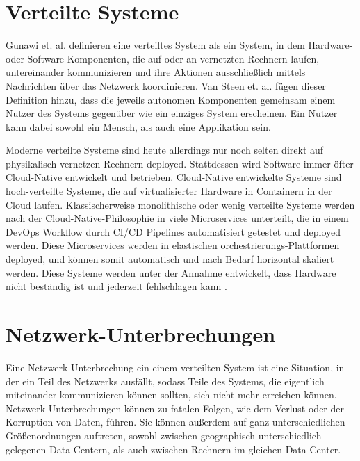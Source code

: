 \documentclass[12pt,a4paper]{report}
\begin{document}
\section{Verteilte Systeme}
Gunawi et. al. \cite{distributed_systems_concepts_and_design} definieren eine verteiltes System als ein System, in dem Hardware-
oder Software-Komponenten, die auf oder an vernetzten Rechnern laufen, untereinander kommunizieren und ihre Aktionen
ausschließlich mittels Nachrichten über das Netzwerk koordinieren. Van Steen et. al.
\cite{brief_introduction_to_distributed_systems} fügen dieser Definition hinzu, dass die jeweils autonomen Komponenten gemeinsam
einem Nutzer des Systems gegenüber wie ein einziges System erscheinen. Ein Nutzer kann dabei sowohl ein Mensch, als auch eine
Applikation sein.

Moderne verteilte Systeme sind heute allerdings nur noch selten direkt auf physikalisch vernetzen Rechnern deployed. Stattdessen
wird Software immer öfter Cloud-Native entwickelt und betrieben. Cloud-Native entwickelte Systeme sind hoch-verteilte Systeme, die
auf virtualisierter Hardware in Containern in der Cloud laufen. Klassischerweise monolithische oder wenig verteilte Systeme
werden nach der Cloud-Native-Philosophie in viele Microservices unterteilt, die in einem DevOps Workflow durch CI/CD Pipelines
automatisiert getestet und deployed werden. Diese Microservices werden in elastischen orchestrierungs-Plattformen deployed, und
können somit automatisch und nach Bedarf horizontal skaliert werden. \cite{cloud_native_10_years} Diese Systeme werden unter der
Annahme entwickelt, dass Hardware nicht beständig ist und jederzeit fehlschlagen kann \cite{cloud_native_applications}.

\section{Netzwerk-Unterbrechungen}
Eine Netzwerk-Unterbrechung ein einem verteilten System ist eine Situation, in der ein Teil des Netzwerks ausfällt, sodass Teile
des Systems, die eigentlich miteinander kommunizieren können sollten, sich nicht mehr erreichen können. Netzwerk-Unterbrechungen
können zu fatalen Folgen, wie dem Verlust oder der Korruption von Daten, führen. Sie können außerdem auf ganz unterschiedlichen
Größenordnungen auftreten, sowohl zwischen geographisch unterschiedlich gelegenen Data-Centern, als auch zwischen Rechnern im
gleichen Data-Center. \cite{analysis_of_network_partition_failures}
\end{document}
